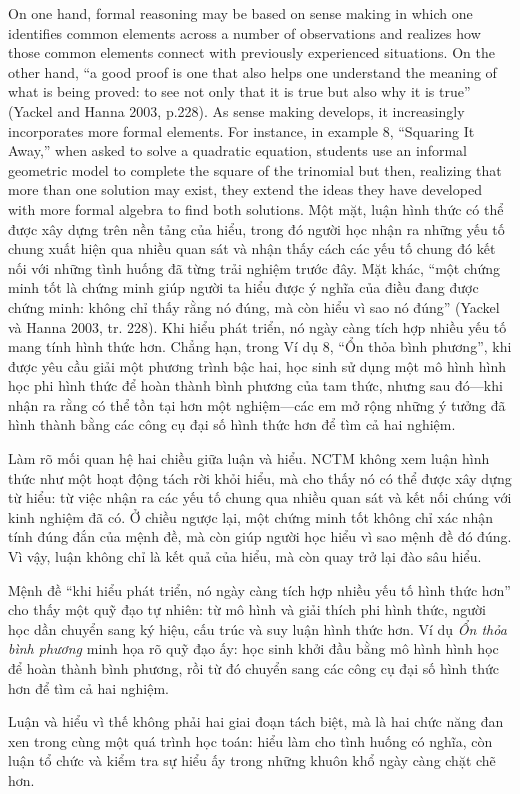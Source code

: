 \documentclass[
  10pt,
  a4paper,
  landscape,
  twoside,
  openany
]{scrbook}
\newcommand{\EN}[1]{#1}
\newcommand{\VI}[1]{#1}
\newcommand{\NOTE}[1]{#1}
\newcounter{example}
\begin{document}
\TriPara
{
\EN{On one hand, formal reasoning may be based on sense making in which one identifies common elements across a number of observations and realizes how those common elements connect with previously experienced situations. On the other hand, ``a good proof is one that also helps one understand the meaning of what is being proved: to see not only that it is true but also why it is true'' (Yackel and Hanna 2003, p.228). As sense making develops, it increasingly incorporates more formal elements. For instance, in example 8, ``Squaring It Away,'' when asked to solve a quadratic equation, students use an informal geometric model to complete the square of the trinomial but then, realizing that more than one solution may exist, they extend the ideas they have developed with more formal algebra to find both solutions.}
}
{
\VI{Một mặt, luận hình thức có thể được xây dựng trên nền tảng của hiểu, trong đó người học nhận ra những yếu tố chung xuất hiện qua nhiều quan sát và nhận thấy cách các yếu tố chung đó kết nối với những tình huống đã từng trải nghiệm trước đây. Mặt khác, ``một chứng minh tốt là chứng minh giúp người ta hiểu được ý nghĩa của điều đang được chứng minh: không chỉ thấy rằng nó đúng, mà còn hiểu vì sao nó đúng'' (Yackel và Hanna 2003, tr. 228). Khi hiểu phát triển, nó ngày càng tích hợp nhiều yếu tố mang tính hình thức hơn. Chẳng hạn, trong Ví dụ 8, ``Ổn thỏa bình phương'', khi được yêu cầu giải một phương trình bậc hai, học sinh sử dụng một mô hình hình học phi hình thức để hoàn thành bình phương của tam thức, nhưng sau đó---khi nhận ra rằng có thể tồn tại hơn một nghiệm---các em mở rộng những ý tưởng đã hình thành bằng các công cụ đại số hình thức hơn để tìm cả hai nghiệm.}
}
{
\NOTE{Làm rõ mối quan hệ hai chiều giữa luận và hiểu. NCTM không xem luận hình thức như một hoạt động tách rời khỏi hiểu, mà cho thấy nó có thể được xây dựng từ hiểu: từ việc nhận ra các yếu tố chung qua nhiều quan sát và kết nối chúng với kinh nghiệm đã có. Ở chiều ngược lại, một chứng minh tốt không chỉ xác nhận tính đúng đắn của mệnh đề, mà còn giúp người học hiểu vì sao mệnh đề đó đúng. Vì vậy, luận không chỉ là kết quả của hiểu, mà còn quay trở lại đào sâu hiểu.

Mệnh đề ``khi hiểu phát triển, nó ngày càng tích hợp nhiều yếu tố hình thức hơn'' cho thấy một quỹ đạo tự nhiên: từ mô hình và giải thích phi hình thức, người học dần chuyển sang ký hiệu, cấu trúc và suy luận hình thức hơn. Ví dụ \emph{Ổn thỏa bình phương} minh họa rõ quỹ đạo ấy: học sinh khởi đầu bằng mô hình hình học để hoàn thành bình phương, rồi từ đó chuyển sang các công cụ đại số hình thức hơn để tìm cả hai nghiệm.

Luận và hiểu vì thế không phải hai giai đoạn tách biệt, mà là hai chức năng đan xen trong cùng một quá trình học toán: hiểu làm cho tình huống có nghĩa, còn luận tổ chức và kiểm tra sự hiểu ấy trong những khuôn khổ ngày càng chặt chẽ hơn.}
}
\end{document}
